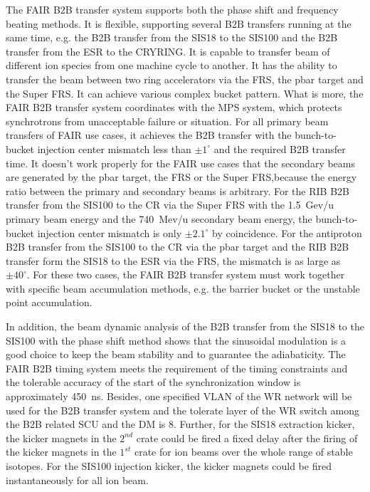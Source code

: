 The FAIR B2B transfer system supports both the phase shift and frequency beating methods. It is flexible, supporting several B2B transfers running at the same time, e.g. the B2B transfer from the SIS18 to the SIS100 and the B2B transfer from the ESR to the CRYRING. It is capable to transfer beam of different ion species from one machine cycle to another. It has the ability to transfer the beam between two ring accelerators via the FRS, the pbar target and the Super FRS. It can achieve various complex bucket pattern. What is more, the FAIR B2B transfer system coordinates with the MPS system, which protects synchrotrons from unacceptable failure or situation. For all primary beam transfers of FAIR use cases, it achieves the B2B transfer with the bunch-to-bucket injection center mismatch less than $\pm1^\circ$ and the required B2B transfer time. It doesn't work properly for the FAIR use cases that the secondary beams are generated by the pbar target, the FRS or the Super FRS,because the energy ratio between the primary and secondary beams is arbitrary. For the RIB B2B transfer from the SIS100 to the CR via the Super FRS with the \SI{1.5}{Gev/u} primary beam energy and the \SI{740}{Mev/u} secondary beam energy, the bunch-to-bucket injection center mismatch is only $\pm2.1^\circ$ by coincidence. For the antiproton B2B transfer from the SIS100 to the CR via the pbar target and the RIB B2B transfer form the SIS18 to the ESR via the FRS, the mismatch is as large as $\pm40^\circ$. For these two cases, the FAIR B2B transfer system must work together with specific beam accumulation methods, e.g. the barrier bucket or the unstable point accumulation.
 

In addition, the beam dynamic analysis of the B2B transfer from the SIS18 to the SIS100 with the phase shift method shows that the sinusoidal modulation is a good choice to keep the beam stability and to guarantee the adiabaticity. The FAIR B2B timing system meets the requirement of the timing constraints and the tolerable accuracy of the start of the synchronization window is approximately \SI{450}{\ns}. Besides, one specified VLAN of the WR network will be used for the B2B transfer system and the tolerate layer of the WR switch among the B2B related SCU and the DM is 8.  Further, for the SIS18 extraction kicker, the kicker magnets in the $2^{nd}$ crate could be fired a fixed delay after the firing of the kicker magnets in the $1^{st}$ crate for ion beams over the whole range of stable isotopes. For the SIS100 injection kicker, the kicker magnets could be fired instantaneously for all ion beam. 

